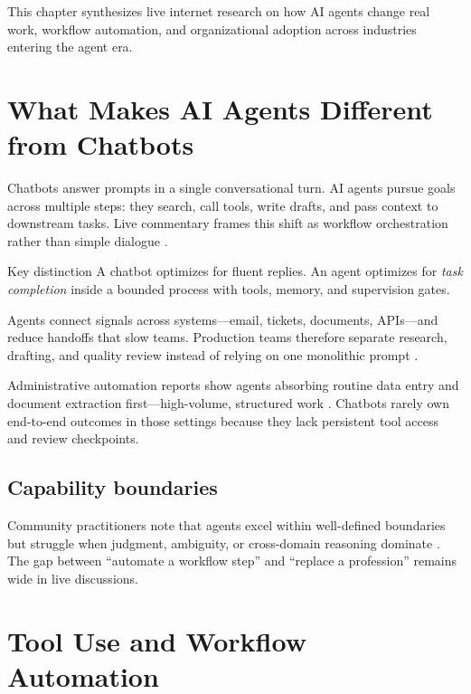 
\begin{chapterintrobox}
This chapter synthesizes live internet research on how AI agents change real work,
workflow automation, and organizational adoption across industries entering the agent era.
\end{chapterintrobox}

\section{What Makes AI Agents Different from Chatbots}
\label{sec:agents-vs-chatbots}

Chatbots answer prompts in a single conversational turn. AI agents pursue goals across
multiple steps: they search, call tools, write drafts, and pass context to downstream
tasks. Live commentary frames this shift as workflow orchestration rather than simple
dialogue \cite{mediumworkflowagents}.

\begin{insightbox}{Key distinction}
A chatbot optimizes for fluent replies. An agent optimizes for \emph{task completion}
inside a bounded process with tools, memory, and supervision gates.
\end{insightbox}

Agents connect signals across systems---email, tickets, documents, APIs---and reduce
handoffs that slow teams. Production teams therefore separate research, drafting, and
quality review instead of relying on one monolithic prompt \cite{mediumworkflowagents}.

Administrative automation reports show agents absorbing routine data entry and document
extraction first---high-volume, structured work \cite{recomaijobroles}. Chatbots rarely
own end-to-end outcomes in those settings because they lack persistent tool access and
review checkpoints.

\subsection{Capability boundaries}
Community practitioners note that agents excel within well-defined boundaries but struggle
when judgment, ambiguity, or cross-domain reasoning dominate
\cite{redditcomplextasks}. The gap between ``automate a workflow step'' and ``replace a
profession'' remains wide in live discussions.

\section{Tool Use and Workflow Automation}
\label{sec:tool-use}

